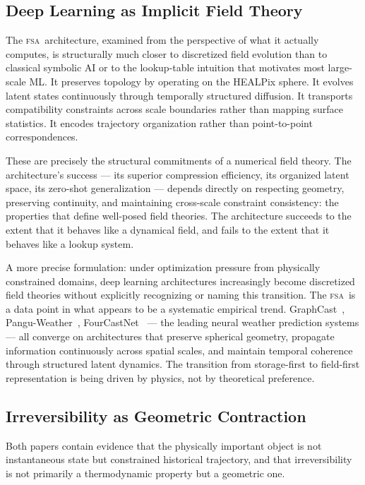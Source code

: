 \documentclass[11pt,a4paper]{article}
\theoremstyle{plain}
\theoremstyle{definition}
\theoremstyle{remark}
\newcommand{\FSA}{\textup{\textsc{fsa}}}
\begin{document}
\subsection{Deep Learning as Implicit Field Theory}

The \FSA\ architecture, examined from the perspective of what it actually
computes, is structurally much closer to discretized field evolution than to
classical symbolic AI or to the lookup-table intuition that motivates most
large-scale ML. It preserves topology by operating on the HEALPix sphere.
It evolves latent states continuously through temporally structured diffusion.
It transports compatibility constraints across scale boundaries rather than
mapping surface statistics. It encodes trajectory organization rather than
point-to-point correspondences.

These are precisely the structural commitments of a numerical field theory.
The architecture's success --- its superior compression efficiency, its
organized latent space, its zero-shot generalization --- depends directly
on respecting geometry, preserving continuity, and maintaining cross-scale
constraint consistency: the properties that define well-posed field theories.
The architecture succeeds to the extent that it behaves like a dynamical
field, and fails to the extent that it behaves like a lookup system.

A more precise formulation: under optimization pressure from physically
constrained domains, deep learning architectures increasingly become
discretized field theories without explicitly recognizing or naming this
transition. The \FSA\ is a data point in what appears to be a systematic
empirical trend. GraphCast~\cite{Lam2023}, Pangu-Weather~\cite{Bi2023},
FourCastNet~\cite{Kurth2023} --- the leading neural weather prediction
systems --- all converge on architectures that preserve spherical geometry,
propagate information continuously across spatial scales, and maintain
temporal coherence through structured latent dynamics. The transition from
storage-first to field-first representation is being driven by physics, not
by theoretical preference.

\subsection{Irreversibility as Geometric Contraction}

Both papers contain evidence that the physically important object is not
instantaneous state but constrained historical trajectory, and that
irreversibility is not primarily a thermodynamic property but a geometric one.
\end{document}
